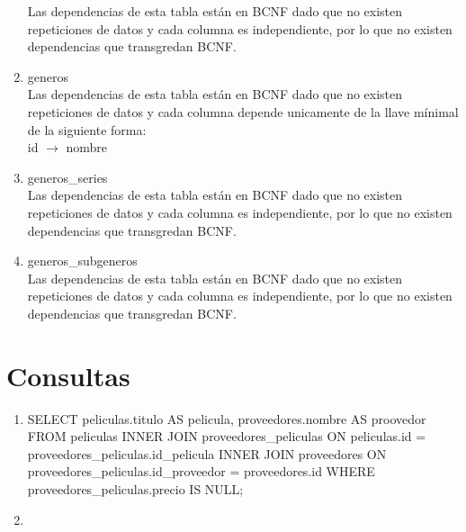 \documentclass{article}
\begin{document}
\begin{enumerate}
    Las dependencias de esta tabla están en BCNF dado que no existen repeticiones de datos y cada columna es independiente, por lo que no existen dependencias que transgredan BCNF. \\
     \item generos \\
    Las dependencias de esta tabla están en BCNF dado que no existen repeticiones de datos y cada columna depende unicamente de la llave mínimal de la siguiente forma: \\
    id $\rightarrow$ nombre \\
    \item generos\_series \\
    Las dependencias de esta tabla están en BCNF dado que no existen repeticiones de datos y cada columna es independiente, por lo que no existen dependencias que transgredan BCNF. \\
    \item generos\_subgeneros\\
    Las dependencias de esta tabla están en BCNF dado que no existen repeticiones de datos y cada columna es independiente, por lo que no existen dependencias que transgredan BCNF. \\
\end{enumerate}

\section{Consultas}
\begin{enumerate}
    \item SELECT peliculas.titulo AS pelicula, proveedores.nombre AS proovedor FROM peliculas
    INNER JOIN proveedores\_peliculas ON peliculas.id = proveedores\_peliculas.id\_pelicula
    INNER JOIN proveedores ON proveedores\_peliculas.id\_proveedor = proveedores.id
    WHERE proveedores\_peliculas.precio IS NULL;
    \item
\end{enumerate}
\end{document}
